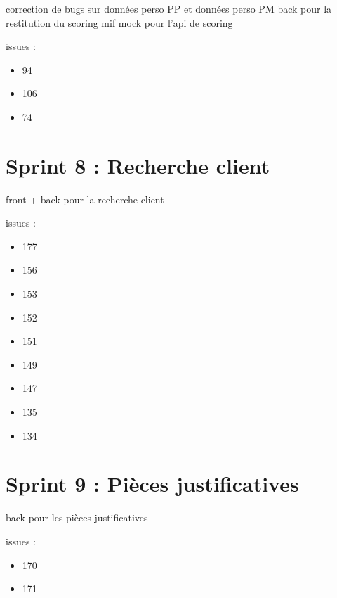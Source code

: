 	correction de bugs sur données perso PP et données perso PM	
	back pour la restitution du scoring mif
	mock pour l'api de scoring
	
issues :
\begin{itemize}
	\item 94
	\item 106
	\item 74
\end{itemize}

\section{Sprint 8 : Recherche client}

front + back pour la recherche client

issues :
\begin{itemize}
	\item 177
	\item 156
	\item 153
	\item 152
	\item 151
	\item 149
	\item 147
	\item 135
	\item 134
\end{itemize}

\section{Sprint 9 : Pièces justificatives}

back pour les pièces justificatives

issues :
\begin{itemize}
	\item 170
	\item 171
\end{itemize}